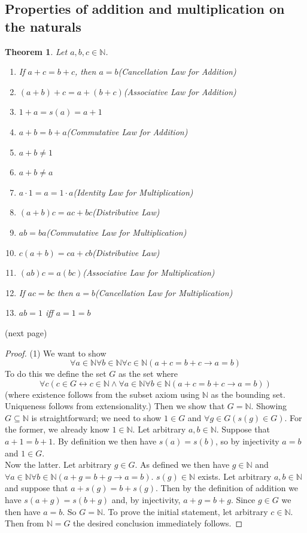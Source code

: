 \documentclass{report}
\newtheorem{theorem}[theo]{Theorem}
\begin{document}
\subsection{Properties of addition and multiplication on the naturals}
\begin{theorem}\label{natural arithmetic}
Let $a,b,c\in\mathbb N$.
\begin{enumerate}
\item If $a+c=b+c$, then $a=b$\quad(Cancellation Law for Addition)
\item $(a+b)+c=a+(b+c)$\quad(Associative Law for Addition)
\item $1+a=s(a)=a+1$
\item $a+b=b+a$\quad(Commutative Law for Addition)
\item $a+b\neq1$
\item $a+b\neq a$
\item $a\cdot1=a=1\cdot a$\quad(Identity Law for Multiplication)
\item $(a+b)c=ac+bc$\quad(Distributive Law)
\item $ab=ba$\quad(Commutative Law for Multiplication)
\item $c(a+b)=ca+cb$\quad(Distributive Law)
\item $(ab)c=a(bc)$\quad(Associative Law for Multiplication)
\item If $ac=bc$ then $a=b$\quad(Cancellation Law for Multiplication)
\item $ab=1$ iff $a=1=b$
\end{enumerate}
\end{theorem}
\noindent(next page)\newpage
\begin{proof}(1)
We want to show
\begin{equation*}
\forall a\in\mathbb N\forall b\in\mathbb N\forall c\in\mathbb N(a+c=b+c\to a=b)
\end{equation*}
To do this we define the set $G$ as the set where
\begin{equation*}
\forall c(c\in G\leftrightarrow c\in\mathbb N\land\forall a\in\mathbb N\forall b\in\mathbb N(a+c=b+c\to a=b))
\end{equation*}
(where existence follows from the subset axiom using $\mathbb N$ as the bounding set. Uniqueness follows from extensionality.) Then we show that $G=\mathbb N$.
Showing $G\subseteq\mathbb N$ is straightforward; we need to show $1\in G$ and $\forall g\in G(s(g)\in G)$.
For the former, we already know $1\in\mathbb N$. Let arbitrary $a,b\in\mathbb N$. Suppose that $a+1=b+1$. By definition we then have $s(a)=s(b)$, so by injectivity $a=b$ and $1\in G$.\\
\indent Now the latter. Let arbitrary $g\in G$. As defined we then have $g\in\mathbb N$ and $\forall a\in\mathbb N\forall b\in\mathbb N(a+g=b+g\to a=b)$. $s(g)\in\mathbb N$ exists. 
Let arbitrary $a,b\in\mathbb N$ and suppose that $a+s(g)=b+s(g)$. Then by the definition of addition we have $s(a+g)=s(b+g)$ and, by injectivity, $a+g=b+g$. Since $g\in G$ we then have
$a=b$. So $G=\mathbb N$. To prove the initial statement, let arbitrary $c\in\mathbb N$. Then from $\mathbb N=G$ the desired conclusion immediately follows.
\end{proof}
\end{document}
